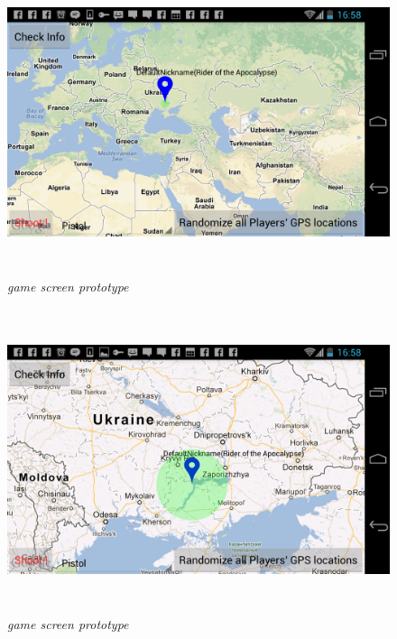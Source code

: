 \begin{figure}
\includegraphics[height=3.5in,width=6.23in]{./images/android_screenshots/ui_prototype/UI_prototype_1.png}  
\caption{\small \sl game screen prototype \label{fig:UIPrototype1}}
\end{figure}

\begin{figure}
\includegraphics[height=3.5in,width=6.23in]{./images/android_screenshots/ui_prototype/UI_prototype_2.png}  
\caption{\small \sl game screen prototype \label{fig:UIPrototype2}}
\end{figure}

